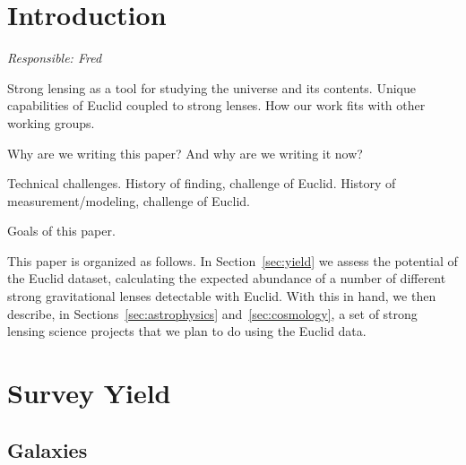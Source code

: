 \documentclass[twocolumn]{svjour3}
\begin{document}

\section{Introduction}

{\it Responsible: Fred}

Strong lensing as a tool for studying the universe and its contents.
Unique capabilities of Euclid coupled to strong lenses. How our  work
fits with other working groups.

Why are we writing this paper? And why are we writing it now?

Technical challenges. History of finding, challenge of Euclid. History
of  measurement/modeling, challenge of Euclid.

Goals of this paper.

This paper is organized as follows. In Section~\ref{sec:yield} we assess
the  potential of the Euclid dataset, calculating the expected abundance
of a  number of different strong gravitational lenses detectable with
Euclid. With  this in hand, we then  describe, in
Sections~\ref{sec:astrophysics} and~\ref{sec:cosmology}, a set  of
strong lensing science projects that we plan to do using the Euclid
data.


\section{Survey Yield}

\subsection{Galaxies}
\end{document}
